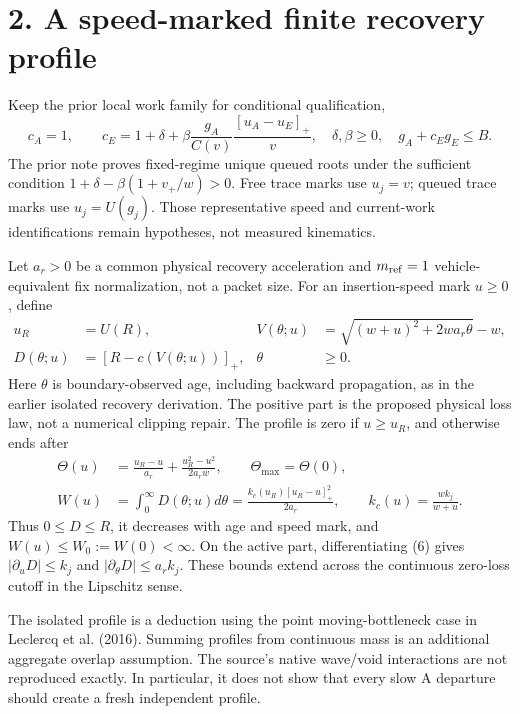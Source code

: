 \documentclass[11pt,a4paper]{article}
\newcommand{\pos}[1]{[#1]_+}
\begin{document}
\newpage
\section*{2. A speed-marked finite recovery profile}

Keep the prior local work family for conditional qualification,
\begin{equation}
 c_A=1,\qquad c_E=1+\delta+\beta\frac{g_A}{C(v)}
                      \frac{\pos{u_A-u_E}}v,\quad
 \delta,\beta\geq0,\quad g_A+c_Eg_E\leq B. \tag{5}
\end{equation}
The prior note proves fixed-regime unique queued roots under the sufficient
condition $1+\delta-\beta(1+v_+/w)>0$. Free trace marks use $u_j=v$;
queued trace marks use $u_j=U(g_j)$. Those representative speed and
current-work identifications remain hypotheses, not measured kinematics.

Let $a_r>0$ be a common physical recovery acceleration and
$m_{\rm ref}=1$ vehicle-equivalent fix normalization, not a packet size.
For an insertion-speed mark $u\geq0$, define
\begin{align}
 u_R&=U(R),&
 V(\theta;u)&=\sqrt{(w+u)^2+2wa_r\theta}-w,\nonumber\\
 D(\theta;u)&=\pos{R-c(V(\theta;u))},&\theta&\geq0. \tag{6}
\end{align}
Here $\theta$ is boundary-observed age, including backward propagation,
as in the earlier isolated recovery derivation. The positive part is the
proposed physical loss law, not a numerical clipping repair. The profile
is zero if $u\geq u_R$, and otherwise ends after
\begin{align}
 \Theta(u)&=\frac{u_R-u}{a_r}+\frac{u_R^2-u^2}{2a_rw},\qquad
 \Theta_{\max}=\Theta(0),\nonumber\\
 W(u)&=\int_0^\infty D(\theta;u)d\theta
   =\frac{k_c(u_R)\pos{u_R-u}^2}{2a_r},\qquad
 k_c(u)=\frac{wk_j}{w+u}. \tag{7}
\end{align}
Thus $0\leq D\leq R$, it decreases with age and speed mark, and
$W(u)\leq W_0:=W(0)<\infty$. On the active part, differentiating (6)
gives $|\partial_uD|\leq k_j$ and
$|\partial_\theta D|\leq a_rk_j$. These bounds extend across the
continuous zero-loss cutoff in the Lipschitz sense.

The isolated profile is a deduction using the point moving-bottleneck
case in Leclercq et al. (2016). Summing profiles from continuous mass is
an additional aggregate overlap assumption. The source's native wave/void
interactions are not reproduced exactly. In particular, it does not show
that every slow A departure should create a fresh independent profile.
\end{document}
